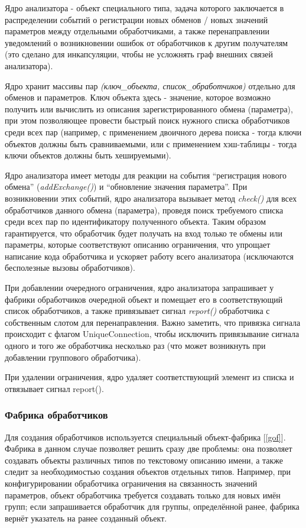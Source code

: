 Ядро анализатора - объект специального типа, задача которого заключается в 
распределении событий о регистрации новых обменов / новых значений параметров 
между отдельными обработчиками, а также перенаправлении уведомлений о 
возникновении ошибок от обработчиков к другим получателям (это сделано для 
инкапсуляции, чтобы не усложнять граф внешних связей анализатора).

Ядро хранит массивы пар \textit{(ключ\_объекта, список\_обработчиков)} 
отдельно для обменов и параметров. Ключ объекта здесь - значение, которое 
возможно получить или вычислить из описания зарегистрированного обмена 
(параметра), при этом позволяющее провести быстрый поиск нужного списка 
обработчиков среди всех пар (например, с применением двоичного дерева поиска - 
тогда ключи объектов должны быть сравниваемыми, или с применением хэш-таблицы - 
тогда ключи объектов должны быть хешируемыми).

Ядро анализатора имеет методы для реакции на события ``регистрация нового 
обмена'' (\textit{addExchange()}) и ``обновление значения параметра''. При 
возникновении этих событий, ядро анализатора вызывает метод \textit{check()} 
для 
всех обработчиков данного обмена (параметра), проведя поиск требуемого списка 
среди всех пар по идентификатору полученного объекта. Таким 
образом гарантируется, что обработчик будет получать на вход только те обмены 
или параметры, которые соответствуют описанию ограничения, что упрощает 
написание кода обработчика и ускоряет работу всего анализатора 
(исключаются бесполезные вызовы обработчиков).

При добавлении очередного ограничения, ядро анализатора запрашивает у фабрики 
обработчиков очередной объект и помещает его в соответствующий список 
обработчиков, а также привязывает сигнал \textit{report()} обработчика с 
собственным слотом для перенаправления. Важно заметить, что привязка сигнала 
происходит с флагом UniqueConnection, чтобы исключить привязывание сигнала 
одного и того же обработчика несколько раз (что может возникнуть при добавлении 
группового обработчика).

При удалении ограничения, ядро удаляет соответствующий элемент из списка и 
отвязывает сигнал report().

\subsubsection{Фабрика обработчиков}

Для создания обработчиков используется специальный объект-фабрика [\ref{gof}]. 
Фабрика в данном случае позволяет решить сразу две проблемы: она позволяет 
создавать объекты различных типов по текстовому описанию имени, а также следит 
за необходимостью создания объектов отдельных типов. Например, при 
конфигурировании обработчика ограничения на связанность значений параметров, 
объект обработчика требуется создавать только для новых имён групп; если 
запрашивается обработчик для группы, определённой ранее, фабрика вернёт 
указатель на ранее созданный объект.

